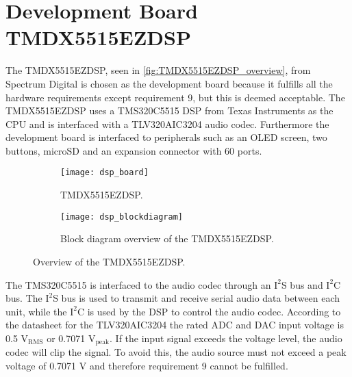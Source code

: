 \section{Development Board TMDX5515EZDSP}

The TMDX5515EZDSP, seen in \autoref{fig:TMDX5515EZDSP_overview}, from Spectrum Digital is chosen as the development board because it fulfills all the hardware requirements except requirement 9, but this is deemed acceptable. The TMDX5515EZDSP uses a TMS320C5515 DSP from Texas Instruments as the CPU and is interfaced with a TLV320AIC3204 audio codec. Furthermore the development board is interfaced to peripherals such as an OLED screen, two buttons, microSD and an expansion connector with 60 ports. 

\begin{figure}[H]
\centering
\begin{subfigure}[t]{0.47\textwidth}
\texttt{[image: dsp\_board]}
	\caption{TMDX5515EZDSP.}
	\label{fig:TMDX5515EZDSP}
\end{subfigure}
\hspace{6mm} 
\begin{subfigure}[t]{0.35\textwidth}
\texttt{[image: dsp\_blockdiagram]}
	\caption{Block diagram overview of the TMDX5515EZDSP.}
	\label{fig:TMDX5515EZDSP_blockdiagram}
\end{subfigure}
\caption{Overview of the TMDX5515EZDSP.}
\label{fig:TMDX5515EZDSP_overview}
\end{figure}

The TMS320C5515 is interfaced to the audio codec through an $\text{I}^2$S bus and $\text{I}^2$C bus. The $\text{I}^2$S bus is used to transmit and receive serial audio data between each unit, while the $\text{I}^2$C is used by the DSP to control the audio codec. According to the datasheet for the TLV320AIC3204 the rated ADC and DAC input voltage is 0.5 $\text{V}_\text{RMS}$ or 0.7071 $\text{V}_\text{peak}$. If the input signal exceeds the voltage level, the audio codec will clip the signal. To avoid this, the audio source must not exceed a peak voltage of 0.7071 V and therefore requirement 9 cannot be fulfilled.















